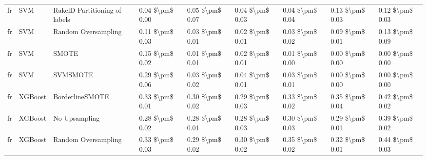 \begin{tabular}{lllllllll}
      fr &                             SVM & RakelD Partitioning of labels & 0.04 \$\textbackslash pm\$ 0.00 &           0.05 \$\textbackslash pm\$ 0.07 &       0.04 \$\textbackslash pm\$ 0.03 &        0.04 \$\textbackslash pm\$ 0.04 &                         0.13 \$\textbackslash pm\$ 0.03 &     0.12 \$\textbackslash pm\$ 0.03 \\
      fr &                             SVM &           Random Oversampling & 0.11 \$\textbackslash pm\$ 0.03 &           0.03 \$\textbackslash pm\$ 0.01 &       0.02 \$\textbackslash pm\$ 0.01 &        0.03 \$\textbackslash pm\$ 0.02 &                         0.09 \$\textbackslash pm\$ 0.01 &     0.13 \$\textbackslash pm\$ 0.09 \\
      fr &                             SVM &                         SMOTE & 0.15 \$\textbackslash pm\$ 0.02 &           0.01 \$\textbackslash pm\$ 0.01 &       0.02 \$\textbackslash pm\$ 0.01 &        0.01 \$\textbackslash pm\$ 0.00 &                         0.00 \$\textbackslash pm\$ 0.00 &     0.00 \$\textbackslash pm\$ 0.00 \\
      fr &                             SVM &                      SVMSMOTE & 0.29 \$\textbackslash pm\$ 0.06 &           0.03 \$\textbackslash pm\$ 0.02 &       0.04 \$\textbackslash pm\$ 0.01 &        0.03 \$\textbackslash pm\$ 0.01 &                         0.00 \$\textbackslash pm\$ 0.00 &     0.00 \$\textbackslash pm\$ 0.00 \\
      fr &                         XGBoost &               BorderlineSMOTE & 0.33 \$\textbackslash pm\$ 0.01 &           0.30 \$\textbackslash pm\$ 0.02 &       0.29 \$\textbackslash pm\$ 0.03 &        0.33 \$\textbackslash pm\$ 0.02 &                         0.35 \$\textbackslash pm\$ 0.04 &     0.42 \$\textbackslash pm\$ 0.02 \\
      fr &                         XGBoost &                 No Upsampling & 0.28 \$\textbackslash pm\$ 0.02 &           0.28 \$\textbackslash pm\$ 0.01 &       0.28 \$\textbackslash pm\$ 0.03 &        0.30 \$\textbackslash pm\$ 0.03 &                         0.29 \$\textbackslash pm\$ 0.01 &     0.39 \$\textbackslash pm\$ 0.02 \\
      fr &                         XGBoost &           Random Oversampling & 0.33 \$\textbackslash pm\$ 0.03 &           0.29 \$\textbackslash pm\$ 0.02 &       0.30 \$\textbackslash pm\$ 0.02 &        0.35 \$\textbackslash pm\$ 0.02 &                         0.32 \$\textbackslash pm\$ 0.01 &     0.44 \$\textbackslash pm\$ 0.03 \\

\end{tabular}
